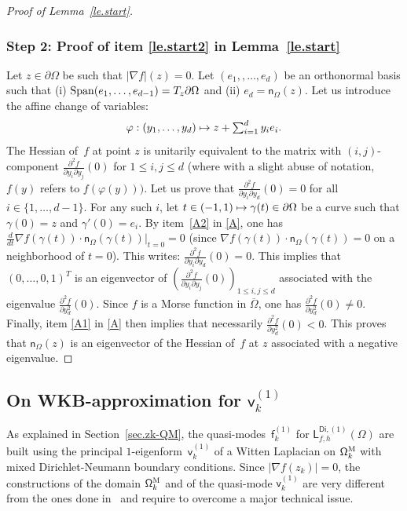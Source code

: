 \documentclass[10pt]{amsart}
\let\ts\textstyle
\newcommand\mto{\mathchoice{\longmapsto}{\mapsto}{\mapsto}{\mapsto}}
\theoremstyle{plain}
\theoremstyle{definition}
\begin{document}
\begin{proof}[Proof of Lemma~\ref{le.start}]
\subsubsection*{Step 2: Proof of item \eqref{le.start2} in Lemma~\ref{le.start}}
Let $z\in \partial \Omega$ be such that $\vert \nabla f\vert (z)=0$.
Let $(e_1,, \ldots,e_d)$ be an orthonormal basis such that (i) $ {\rm
Span}(e_1, \ldots, e_{d-1}) = T_z \partial \Omega$ and (ii) $e_d = \mathsf n_\Omega(z)$.
Let us introduce the affine change of variables:
\[\ts
\varphi: (y_1,\ldots,y_d) \mto z + \sum_{i=1}^d y_i e_i.
\]
The Hessian of~$f$ at point $z$
is unitarily equivalent to the matrix with $(i,j)$-component
$\frac{\partial^2 f}{\partial y_i \partial y_j}(0)$ for $1 \le i,j
\le d$ (where with a slight abuse of notation, $f(y)$ refers to $f
(\varphi(y)))$. Let us prove that
$\frac{\partial^2 f}{\partial y_i
\partial y_d}(0)=0$ for all $i \in \{1, \ldots, d-1\}$. For any such $i$,
let $t \in (-1,1) \mto \gamma(t) \in \partial \Omega$ be a
curve such that $\gamma(0)=z$ and $\gamma'(0)=e_i$. By item~\eqref{A2} in \ref{A}, one has
$\frac{d}{dt} \nabla f(\gamma(t)) \cdot \mathsf n_{\Omega}(\gamma(t)) \big|_{t=0} = 0$ (since $\nabla f(\gamma(t)) \cdot
\mathsf n_{\Omega}(\gamma(t))=0$ on a neighborhood of $t=0$). This writes:
$\frac{\partial^2 f}{\partial y_i \partial y_d}(0)=0$. This implies that
$(0,\ldots,0,1)^T$ is an eigenvector of $\left(\frac{\partial^2
f}{\partial y_i \partial y_j}(0)\right)_{1 \le i,j \le d}$ associated
with the eigenvalue $\frac{\partial^2 f}{\partial y_d^2}(0)$. Since $f$
is a Morse function in $\overline{\Omega}$, one has $\frac{\partial^2
f}{\partial y_d^2}(0)\neq 0$. Finally, item \eqref{A1} in \ref{A} then
implies that necessarily $\frac{\partial^2 f}{\partial y_d^2}(0) < 0$.
This proves that $\mathsf n_\Omega(z)$ is an eigenvector of the Hessian of~$f$ at $z$ associated with a negative eigenvalue. \end{proof}

\subsection{On WKB-approximation for $ \mathsf v_k^{(1)}$}\label{sec:WKB}

As explained in Section~\ref{sec.zk-QM}, the quasi-modes~$\mathsf f_k^{(1)}$
for $\mathsf L_{f,h}^{\mathsf{Di},(1)}(\Omega)$ are built using the
principal $1$-eigenform~$ \mathsf v_k^{(1)} $ of a Witten Laplacian on $\mathsf \Omega_k^{\textsc{M}}$ with
mixed Dirichlet-Neumann boundary conditions. Since $\vert \nabla f(z_k)\vert =0$, the constructions of the domain $\mathsf \Omega_k^{\textsc{M}}$ and of the quasi-mode $\mathsf v_k^{(1)} $ are very different from the ones done in~\cite{DLLN} and require to overcome a major technical issue.
\end{document}
